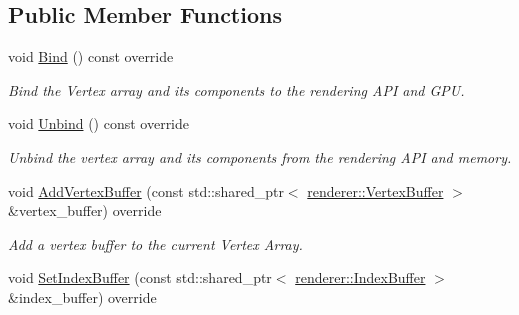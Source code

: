 \subsection*{Public Member Functions}
\begin{DoxyCompactItemize}
\item 
\mbox{\label{classengine_1_1platform_1_1opengl_1_1OpenGLVertexArray_a50dce83908edb0299ac5e2d8531368db}} 
void \hyperlink{classengine_1_1platform_1_1opengl_1_1OpenGLVertexArray_a50dce83908edb0299ac5e2d8531368db}{Bind} () const override
\begin{DoxyCompactList}\small\item\em Bind the Vertex array and it\textquotesingle{}s components to the rendering A\+PI and G\+PU. \end{DoxyCompactList}\item 
\mbox{\label{classengine_1_1platform_1_1opengl_1_1OpenGLVertexArray_a783cfdcfb89c62dbc471abd4a5715a44}} 
void \hyperlink{classengine_1_1platform_1_1opengl_1_1OpenGLVertexArray_a783cfdcfb89c62dbc471abd4a5715a44}{Unbind} () const override
\begin{DoxyCompactList}\small\item\em Unbind the vertex array and it\textquotesingle{}s components from the rendering A\+PI and memory. \end{DoxyCompactList}\item 
\mbox{\label{classengine_1_1platform_1_1opengl_1_1OpenGLVertexArray_afd81627770d787417dbfbab7c8a6878c}} 
void \hyperlink{classengine_1_1platform_1_1opengl_1_1OpenGLVertexArray_afd81627770d787417dbfbab7c8a6878c}{Add\+Vertex\+Buffer} (const std\+::shared\+\_\+ptr$<$ \hyperlink{classengine_1_1renderer_1_1VertexBuffer}{renderer\+::\+Vertex\+Buffer} $>$ \&vertex\+\_\+buffer) override
\begin{DoxyCompactList}\small\item\em Add a vertex buffer to the current Vertex Array. \end{DoxyCompactList}\item 
\mbox{\label{classengine_1_1platform_1_1opengl_1_1OpenGLVertexArray_a5abf6f00e7d2fe03aa7deb67d84a4755}} 
void \hyperlink{classengine_1_1platform_1_1opengl_1_1OpenGLVertexArray_a5abf6f00e7d2fe03aa7deb67d84a4755}{Set\+Index\+Buffer} (const std\+::shared\+\_\+ptr$<$ \hyperlink{classengine_1_1renderer_1_1IndexBuffer}{renderer\+::\+Index\+Buffer} $>$ \&index\+\_\+buffer) override

\end{DoxyCompactItemize}
